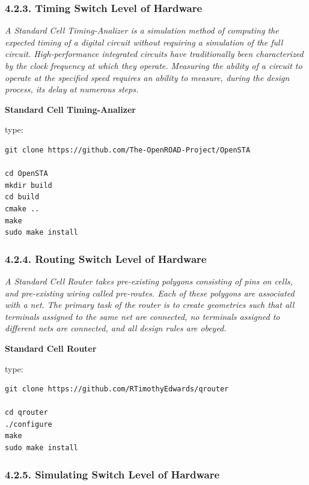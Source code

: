 \documentclass[
]{article}
\begin{document}
\hypertarget{timing-switch-level-of-hardware}{%
\subsubsection{4.2.3. Timing Switch Level of
Hardware}\label{timing-switch-level-of-hardware}}

\emph{A Standard Cell Timing-Analizer is a simulation method of
computing the expected timing of a digital circuit without requiring a
simulation of the full circuit. High-performance integrated circuits
have traditionally been characterized by the clock frequency at which
they operate. Measuring the ability of a circuit to operate at the
specified speed requires an ability to measure, during the design
process, its delay at numerous steps.}

\textbf{Standard Cell Timing-Analizer}

type:

\begin{verbatim}
git clone https://github.com/The-OpenROAD-Project/OpenSTA

cd OpenSTA
mkdir build
cd build
cmake ..
make
sudo make install
\end{verbatim}

\hypertarget{routing-switch-level-of-hardware}{%
\subsubsection{4.2.4. Routing Switch Level of
Hardware}\label{routing-switch-level-of-hardware}}

\emph{A Standard Cell Router takes pre-existing polygons consisting of
pins on cells, and pre-existing wiring called pre-routes. Each of these
polygons are associated with a net. The primary task of the router is to
create geometries such that all terminals assigned to the same net are
connected, no terminals assigned to different nets are connected, and
all design rules are obeyed.}

\textbf{Standard Cell Router}

type:

\begin{verbatim}
git clone https://github.com/RTimothyEdwards/qrouter

cd qrouter
./configure
make
sudo make install
\end{verbatim}

\hypertarget{simulating-switch-level-of-hardware}{%
\subsubsection{4.2.5. Simulating Switch Level of
Hardware}\label{simulating-switch-level-of-hardware}}
\end{document}
